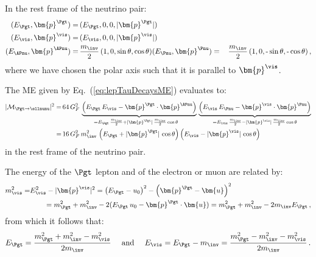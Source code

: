In the rest frame of the neutrino pair:
\begin{align}
( E_{\Pgt}, \bm{p}^{\Pgt} ) = & \, ( E_{\Pgt}, 0, 0, \vert\bm{p}^{\Pgt}\vert ) \nonumber \\
( E_{\vis}, \bm{p}^{\vis} ) = & \, ( E_{\vis}, 0, 0,
\vert\bm{p}^{\vis}\vert ) \nonumber \\
( E_{\APnu}, \bm{p}^{\APnu} ) = & \, \frac{m_{\inv}}{2} \, ( 1, 0, \sin\theta, \cos\theta ) \nonumber 
( E_{\Pnu}, \bm{p}^{\Pnu} ) = & \, \frac{m_{\inv}}{2} \, ( 1, 0, \mbox{-}\sin\theta, \mbox{-}\cos\theta ) \, , \nonumber \\
\end{align}
where we have chosen the polar axis such that it is parallel to $\bm{p}^{\vis}$.

The ME given by Eq.~(\ref{eq:lepTauDecaysME}) evaluates to:
\begin{align}
\vert\mathcal{M}_{\Pgt \to \ellnunu}\vert^{2} 
 = & \, 64 \, G^{2}_{F} \, 
  \underbrace{\left( E_{\Pgt} \, E_{\vis} - \bm{p}^{\Pgt} \cdot \bm{p}^{\APnu} \right)}_{= E_{\Pgt} \, \frac{m_{\inv}}{2} + \vert\bm{p}^{\Pgt}\vert \, \frac{m_{\inv}}{2} \cos\theta \quad} \,
  \underbrace{\left( E_{\vis} \, E_{\Pnu} - \bm{p}^{\vis} \cdot \bm{p}^{\Pnu} \right)}_{= E_{\vis} \, \frac{m_{\inv}}{2} - \vert\bm{p}^{\vis}\vert \, \frac{m_{\inv}}{2} \cos\theta} \nonumber \\
 = & \, 16 \, G^{2}_{F} \, m^{2}_{\inv} \, \left( E_{\Pgt} + \vert\bm{p}^{\Pgt}\vert \, \cos\theta \right)  \left( E_{\vis} - \vert\bm{p}^{\vis}\vert \, \cos\theta \right) 
\label{eq:lepTauDecaysMErf}
\end{align}
in the rest frame of the neutrino pair.

The energy of the $\Pgt$ lepton and of the electron or muon are
related by:
\begin{align}
m^{2}_{\vis} = & E_{\vis}^{2} - \vert\bm{p}^{\vis}\vert^{2} 
 = \left( E_{\Pgt} - u_{0} \right)^{2} - \left( \bm{p}^{\Pgt} - \bm{u} \right)^{2} \nonumber \\
& \qquad
 = m^{2}_{\Pgt} + m^{2}_{\inv} - 2 (E_{\Pgt} \, u_{0} - \bm{p}^{\Pgt} \cdot \bm{u}) 
 = m^{2}_{\Pgt} + m^{2}_{\inv} - 2 m_{\inv} E_{\Pgt} \, ,
\end{align}
from which it follows that:
\begin{equation}
E_{\Pgt} = \frac{m^{2}_{\Pgt} + m^{2}_{\inv} - m^{2}_{\vis}}{2
  m_{\inv}} \quad \mbox{ and } \quad E_{\vis} = E_{\Pgt} - m_{\inv} =
\frac{m^{2}_{\Pgt} - m^{2}_{\inv} - m^{2}_{\vis}}{2 m_{\inv}} \, .
\label{eq:lepTauDecaysEn}
\end{equation}

